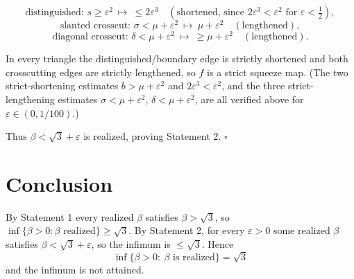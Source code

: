 \documentclass[12pt]{article}
\newcommand{\eps}{\varepsilon}
\begin{document}
\begin{itemize}
\begin{itemize}
\[
\text{distinguished: } s\ge\eps^2\ \mapsto\ \le2\eps^3
\quad(\text{shortened, since }2\eps^3<\eps^2\text{ for }\eps<\tfrac12),
\]
\[
\text{slanted crosscut: } \sigma<\mu+\eps^2\ \mapsto\ \mu+\eps^2
\quad(\text{lengthened}),
\]
\[
\text{diagonal crosscut: } \delta<\mu+\eps^2\ \mapsto\ \ge\mu+\eps^2
\quad(\text{lengthened}).
\]
\end{itemize}
In every triangle the distinguished/boundary edge is strictly shortened
and both crosscutting edges are strictly lengthened, so $f$ is a strict
squeeze map. (The two strict-shortening estimates $b>\mu+\eps^2$ and
$2\eps^3<\eps^2$, and the three strict-lengthening estimates
$\sigma<\mu+\eps^2$, $\delta<\mu+\eps^2$, are all verified above for
$\eps\in(0,1/100)$.)
\end{itemize}
Thus $\beta<\sqrt3+\eps$ is realized, proving Statement 2. \hfill$\square$

\section{Conclusion}

By Statement 1 every realized $\beta$ satisfies $\beta>\sqrt3$, so
$\inf\{\beta>0:\beta\text{ realized}\}\ge\sqrt3$. By Statement 2, for
every $\eps>0$ some realized $\beta$ satisfies $\beta<\sqrt3+\eps$, so the
infimum is $\le\sqrt3$. Hence
\[
\boxed{\ \inf\{\beta>0:\ \beta\text{ is realized}\}=\sqrt3\ }
\]
and the infimum is not attained.
\end{document}
